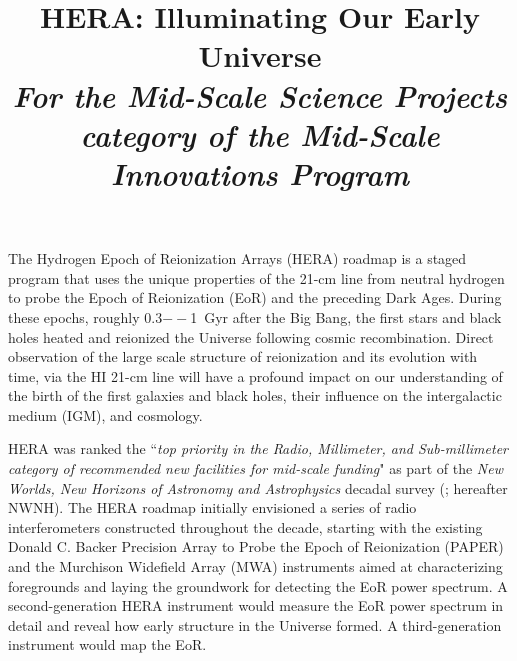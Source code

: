 \documentclass[preprint]{aastex}
\def\HI{{H{\small I }}}
\begin{document}
\title{HERA: Illuminating Our Early Universe\\
{\it For the Mid-Scale Science Projects category of the Mid-Scale Innovations Program}} 



{ \setlength{\parindent}{0cm}
The Hydrogen Epoch of Reionization Arrays (HERA) roadmap is a staged 
program that uses the unique properties of the 21-cm line from neutral 
hydrogen to probe the 
Epoch of Reionization (EoR) and the preceding Dark Ages.  
During these epochs, roughly 0.3$--$1~Gyr after the Big Bang, the first stars and black holes heated and reionized the Universe following cosmic recombination. %
Direct observation of the large scale structure of reionization and its evolution with time,
via the \HI 21-cm line will have a profound impact on our
understanding of the birth of the first galaxies and black holes, their
influence on the intergalactic medium (IGM), and cosmology.}  

HERA was ranked the ``{\it top priority in the Radio, Millimeter, and Sub-millimeter
category of recommended new facilities for mid-scale funding}" as part of the
{\it New Worlds, New Horizons of Astronomy and Astrophysics} decadal survey
(\citealt{astro2010}; hereafter NWNH).  
The HERA roadmap initially envisioned a series of
radio interferometers constructed throughout the decade, starting with the 
existing
Donald C. Backer Precision Array to Probe the Epoch of Reionization (PAPER) and 
the Murchison Widefield Array (MWA) instruments 
aimed at characterizing
foregrounds and laying the groundwork for detecting the EoR power
spectrum. 
A second-generation HERA instrument would measure the EoR power spectrum in
detail and reveal how early structure in the Universe formed. A
third-generation instrument would map the EoR.
\end{document}
